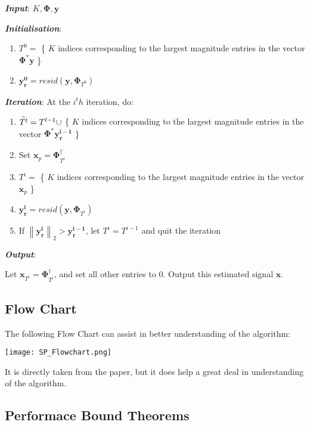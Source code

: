 \documentclass[fleqn, 11pt]{article}
\newcommand{\bs}[1]{\boldsymbol{#1}}
\newcommand\norm[1]{\left\lVert#1\right\rVert}
\begin{document}
\medskip

\textbf{\textit{Input}}: $K, \bs{\Phi}, \bs{y}$

\medskip

\textbf{\textit{Initialisation}}:
\begin{enumerate}
    \item $T^0 = $ \{ $K$ indices corresponding to the largest magnitude entries in the vector $\bs{\Phi^*y}$ \} 
    \item $\bs{y^0_r}  = resid ( \bs{y}, \bs{\Phi}_{T^0} ) $
\end{enumerate}

\textbf{\textit{Iteration}}:
At the $i^th$ iteration, do:

\begin{enumerate}
    \item $\Tilde{T^l} = T^{l-1} \cup $ \{ $K$ indices corresponding to the largest magnitude entries in the vector $\bs{\Phi^*y^{i-1}_r}$ \}
    \item Set $\bs{x}_p = \bs{\Phi}^{\dagger}_{T^i}  $
    \item $T^i = $ \{ $K$ indices corresponding to the largest magnitude entries in the vector $\bs{x}_p$ \} 
    \item $\bs{y^i_r}  = resid ( \bs{y}, \bs{\Phi}_{T^i} ) $
    \item If $\norm{\bs{y^i_r}  }_2 > \bs{y^{i-1}_r}  $,  let ${T^i}= {T^{i-1}}$ and quit the iteration
\end{enumerate} 

\textbf{\textit{Output}}:

Let $\bs{x}_{T^i} = \bs{\Phi}^{\dagger}_{T^i}  $, and set all other entries to 0. Output this estimated signal $\bs{x}$.

\hrulefill

\subsection*{Flow Chart}

The following Flow Chart can assist in better understanding of the algorithm: 

\texttt{[image: SP\_Flowchart.png]}

It is directly taken from the paper, but it does help a great deal in  understanding of the algorithm.

\newpage

\subsection*{Performace Bound Theorems }
\end{document}
